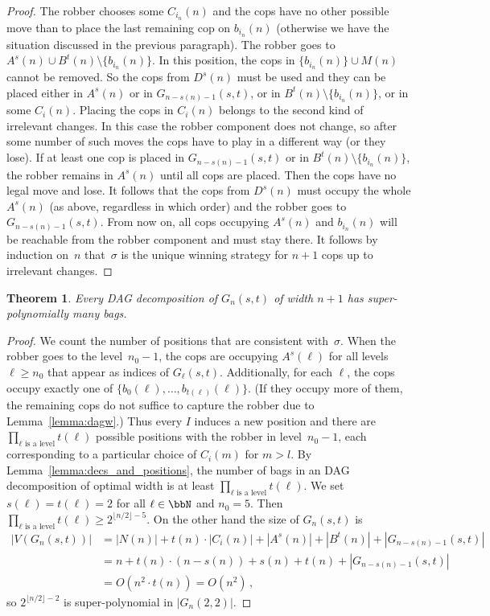\documentclass[authoryear]{article}
\newtheorem{theorem}{Theorem}
\theoremstyle{definition}
\newcommand{\0}{\emptyset}
\begin{document}
\begin{proof}
  The robber chooses some $C_{i_n}(n)$ and the cops have no other possible move
  than to place the last remaining cop on $b_{i_n}(n)$ (otherwise we have the
  situation discussed in the previous paragraph). The robber goes to
  $A^s(n)\cup B^t(n)\setminus \{b_{i_n}(n)\}$. In this position, the cops in
  $\{b_{i_n}(n)\} \cup M(n)$ cannot be removed. So the cops from $D^s(n)$ must
  be used and they can be placed either in $A^s(n)$ or in $G_{n-s(n)-1}(s,t)$,
  or in $B^t(n)\setminus \{b_{i_n}(n)\}$, or in some $C_i(n)$. Placing the cops
  in $C_i(n)$ belongs to the second kind of irrelevant changes. In this case the
  robber component does not change, so after some number of such moves the cops
  have to play in a different way (or they lose). If at least one cop is placed
  in $G_{n-s(n)-1}(s,t)$ or in $B^t(n)\setminus \{b_{i_n}(n)\}$, the robber
  remains in $A^s(n)$ until all cops are placed. Then the cops have no legal
  move and lose. It follows that the cops from $D^s(n)$ must occupy the whole
  $A^s(n)$ (as above, regardless in which order) and the robber goes to
  $G_{n-s(n)-1}(s,t)$. From now on, all cops occupying $A^s(n)$ and $b_{i_n}(n)$
  will be reachable from the robber component and must stay there. It follows by
  induction on~$n$ that~$\sigma$ is the unique winning strategy for $n+1$ cops
  up to irrelevant changes.
\end{proof}

\begin{theorem}\label{thm:super-poly}
Every DAG decomposition of $G_n(s,t)$ of width $n+1$ has
super-po\-ly\-no\-mial\-ly many bags.
\end{theorem}
\begin{proof}
We count the number of positions that are consistent
with~$\sigma$. When the robber goes to the level~$n_0-1$, the cops are
occupying $A^s(\ell)$ for all levels $\ell\ge n_0$ that appear as indices of
$G_\ell( s,t)$. Additionally, for each $\ell$, the cops occupy exactly
one of $\{b_0(\ell),\ldots,b_{t(\ell)}(\ell)\}$. (If they occupy more
of them, the remaining cops do not suffice to capture the robber due
to Lemma~\ref{lemma:dagw}.)  Thus every $I$ induces a new position and 
there are $\prod_{\ell \text{ is a
    level}}t(\ell)$ possible positions with the robber in 
level~$n_0-1$, each corresponding to a particular choice of $C_i(m)$ for
$m>l$. By Lemma~\ref{lemma:decs_and_positions}, the number of bags in
  an DAG decomposition of optimal width is at least $\prod_{\ell \text{ is a
    level}}t(\ell)$. We set $s(\ell) = t(\ell)= 2$ for all
$\ell\in\bbN$ and $n_0=5$. Then
$\prod_{\ell \text{ is a level}}t(\ell) \ge 2^{\lfloor n/2\rfloor -
  5}$. On the other hand the size of $G_n(s,t)$ is 
\begin{align*}
|V(G_n(s,t))|& = |N(n)| + t(n)\cdot |C_i(n)| + |A^s(n)| +
|B^t(n)| + |G_{n-s(n)-1}(s,t)|  \\
&= n + t(n)\cdot (n-s(n)) + s(n) + t(n) + |G_{n-s(n)-1}(s,t)|\\
&= O(n^2\cdot t(n)) = O(n^2)\,,
\end{align*}
 so $ 2^{\lfloor n/2\rfloor - 2}$ is super-polynomial in
$|G_n(2,2)|$. 
\end{proof}
\end{document}
